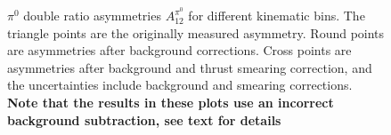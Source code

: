 \begin{figure}[t]
  \caption[$\pi^0$ double ratio asymmetries $A^{\pi^0}_{12}$ after background and thrust-smearing corrections for different kinematic bins]{$\pi^0$ double ratio asymmetries $A^{\pi^0}_{12}$ for different kinematic bins. The triangle points are the originally measured asymmetry. Round points are asymmetries after background corrections. Cross points are asymmetries after background and thrust smearing correction, and the uncertainties include background and smearing corrections. {\bf Note that the results in these plots use an incorrect background subtraction, see text for details}}
  \label{fig:pi0result}
\end{figure}

\begin{figure}[h]
  \centering     \tiny

\end{figure}

